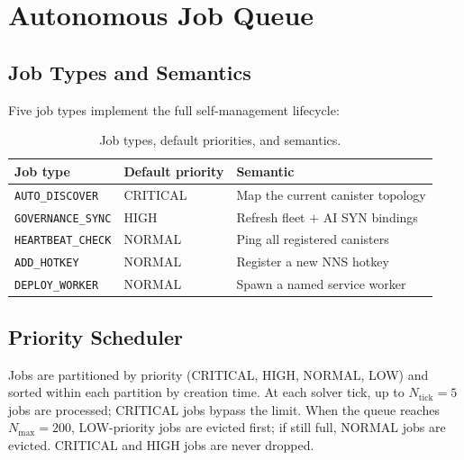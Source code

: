 \documentclass[12pt]{article}
\begin{document}
\section{Autonomous Job Queue}
\label{sec:jobqueue}

\subsection{Job Types and Semantics}

Five job types implement the full self-management lifecycle:

\begin{table}[h]
  \centering
  \caption{Job types, default priorities, and semantics.}
  \label{tab:jobs}
  \begin{tabular}{llp{6cm}}
    \toprule
    Job type & Default priority & Semantic \\
    \midrule
    \texttt{AUTO\_DISCOVER}   & CRITICAL & Map the current canister topology \\
    \texttt{GOVERNANCE\_SYNC} & HIGH     & Refresh fleet $+$ AI SYN bindings \\
    \texttt{HEARTBEAT\_CHECK} & NORMAL   & Ping all registered canisters \\
    \texttt{ADD\_HOTKEY}      & NORMAL   & Register a new NNS hotkey \\
    \texttt{DEPLOY\_WORKER}   & NORMAL   & Spawn a named service worker \\
    \bottomrule
  \end{tabular}
\end{table}

\subsection{Priority Scheduler}

Jobs are partitioned by priority (CRITICAL, HIGH, NORMAL, LOW) and sorted
within each partition by creation time.  At each solver tick, up to
$N_\text{tick} = 5$ jobs are processed; CRITICAL jobs bypass the limit.
When the queue reaches $N_\text{max} = 200$, LOW-priority jobs are evicted
first; if still full, NORMAL jobs are evicted.  CRITICAL and HIGH jobs are
never dropped.
\end{document}
